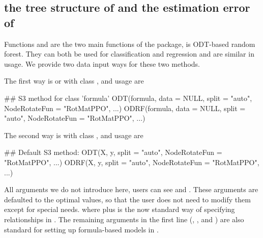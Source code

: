 \documentclass[nojss]{jss}
\newcommand{\fct}[1]{\code{#1()}}
\numberwithin{equation}{section}
\begin{document}
\subsection[print the tree structure of ODT and the estimation error of ODRF]{ the tree structure of  and the estimation error of }
Functions \fct{ODT} and \fct{ODRF} are the two main functions of the  package, \fct{ODRF} is ODT-based random forest. They can both be used for classification and regression and are similar in usage. We provide two data input ways for these two  methods.

The first way is  or  with class , and usage are
\begin{Code}
## S3 method for class 'formula'
ODT(formula, data = NULL, split = "auto", NodeRotateFun = "RotMatPPO", ...)
ODRF(formula, data = NULL, split = "auto", NodeRotateFun = "RotMatPPO", ...)
\end{Code}
The second way is  with class , and usage are
\begin{Code}
## Default S3 method:
ODT(X, y, split = "auto", NodeRotateFun = "RotMatPPO", ...)
ODRF(X, y, split = "auto", NodeRotateFun = "RotMatPPO", ...)
\end{Code}
All arguments we do not introduce here, users can see  and . These arguments are defaulted to the optimal values, so that the user does not need to modify them except for special needs.
where  plus  is the now standard way of specifying relationships in . The remaining arguments in the first line (, , and ) are also standard for setting up formula-based models in .
\end{document}
